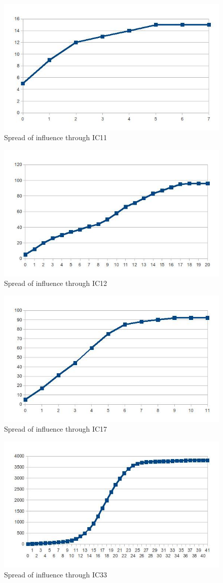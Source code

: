 \begin{figure}[htbp]%
\centering
\includegraphics[width=0.5\columnwidth]{./img/ic11}%
\caption{Spread of influence through IC11}%
\label{fig:ic11}%
\end{figure}

\begin{figure}[htbp]%
\centering
\includegraphics[width=0.5\columnwidth]{./img/ic12}%
\caption{Spread of influence through IC12}%
\label{fig:ic12}%
\end{figure}

\begin{figure}[htbp]%
\centering
\includegraphics[width=0.5\columnwidth]{./img/ic17}%
\caption{Spread of influence through IC17}%
\label{fig:ic17}%
\end{figure}

\begin{figure}[htbp]%
\centering
\includegraphics[width=0.5\columnwidth]{./img/ic33}%
\caption{Spread of influence through IC33}%
\label{fig:ic33}%
\end{figure}

